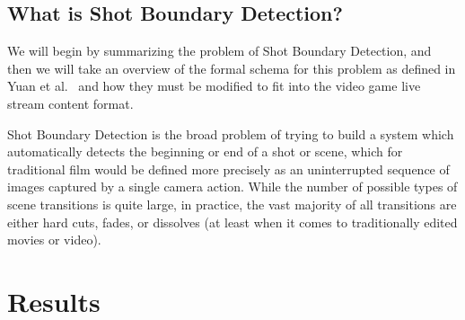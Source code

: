 \documentclass[12pt]{article}
\begin{document}
\subsection{What is Shot Boundary Detection?}
We will begin by summarizing the problem of Shot Boundary Detection, and then we will take an overview of the formal schema for this problem as defined in Yuan et al.~\cite{survey1}
and how they must be modified to fit into the video game live stream content format.

Shot Boundary Detection is the broad problem of trying to build a system which automatically detects the beginning or end of a shot or scene, which for traditional 
film would be defined more precisely as an uninterrupted sequence of images captured by a single camera action. 
While the number of possible types of scene transitions is quite large, in practice, the vast majority of all transitions are either hard cuts, fades, or dissolves 
(at least when it comes to traditionally edited movies or video). 
\clearpage

\section{Results}
\blindtext
\clearpage

{}

\clearpage
\end{document}
